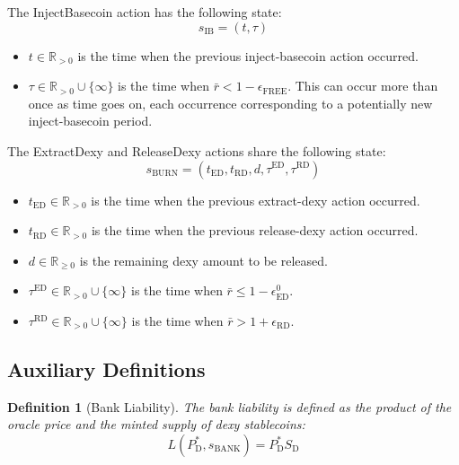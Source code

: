 \documentclass{ifcolog}
\newcommand{\Pdt}{P_{\mathrm{D}}^{*}}
\newcommand{\Sd}{S_{\mathrm{D}}}
\newcommand{\rr}{\bar{r}}
\newcommand{\sbank}{s_{\textrm{BANK}}}
\newtheorem{definition}{Definition}
\begin{document}
The InjectBasecoin action has the following state:
$$s_{\textrm{IB}} = \left(t, \tau\right)$$

\begin{itemize}
  \item $t \in \mathbb{R}_{>0}$ is the time when the previous inject-basecoin action occurred.
  \item $\tau \in \mathbb{R}_{>0}\cup\{\infty\}$ is the time when $\rr < 1 - \epsilon_{\textrm{FREE}}$. This can occur more than once as time goes on,
        each occurrence corresponding to a potentially new inject-basecoin period.
\end{itemize}

The ExtractDexy and ReleaseDexy actions share the following state:
$$s_{\textrm{BURN}} = \left(t_{\textrm{ED}}, t_{\textrm{RD}}, d, \tau^{\textrm{ED}}, \tau^{\textrm{RD}} \right)$$

\begin{itemize}
  \item $t_{\textrm{ED}} \in \mathbb{R}_{>0}$ is the time when the previous extract-dexy action occurred.
  \item $t_{\textrm{RD}} \in \mathbb{R}_{>0}$ is the time when the previous release-dexy action occurred.
  \item $d \in \mathbb{R}_{\ge 0}$ is the remaining dexy amount to be released.
  \item $\tau^{\textrm{ED}} \in \mathbb{R}_{>0}\cup\{\infty\}$ is the time when $\rr \le 1 - \epsilon_{\textrm{ED}}^{0}$. 
  \item $\tau^{\textrm{RD}} \in \mathbb{R}_{>0}\cup\{\infty\}$ is the time when $\rr > 1 + \epsilon_{\textrm{RD}}$.  
\end{itemize}

\subsection{Auxiliary Definitions}

\begin{definition}[Bank Liability]
  The bank liability is defined as the product of 
  the oracle price and the minted supply of dexy stablecoins:
  \begin{equation}
    L(\Pdt, \sbank) = \Pdt \Sd
  \end{equation}
\end{definition}
\end{document}
